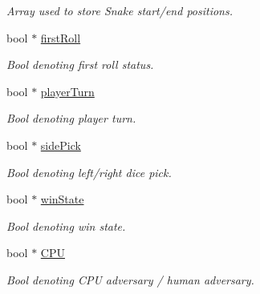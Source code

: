 \begin{DoxyCompactItemize}
\begin{DoxyCompactList}\small\item\em Array used to store Snake start/end positions. \end{DoxyCompactList}\item 
\hypertarget{classgameScene__1_a0743c43ab4837a641140be420ba832b3}{bool $\ast$ \hyperlink{classgameScene__1_a0743c43ab4837a641140be420ba832b3}{first\-Roll}}\label{classgameScene__1_a0743c43ab4837a641140be420ba832b3}

\begin{DoxyCompactList}\small\item\em Bool denoting first roll status. \end{DoxyCompactList}\item 
\hypertarget{classgameScene__1_a4963e2abbca839fd7c77e4f080e8a22f}{bool $\ast$ \hyperlink{classgameScene__1_a4963e2abbca839fd7c77e4f080e8a22f}{player\-Turn}}\label{classgameScene__1_a4963e2abbca839fd7c77e4f080e8a22f}

\begin{DoxyCompactList}\small\item\em Bool denoting player turn. \end{DoxyCompactList}\item 
\hypertarget{classgameScene__1_a696211afed2098458a2e81983c1915a9}{bool $\ast$ \hyperlink{classgameScene__1_a696211afed2098458a2e81983c1915a9}{side\-Pick}}\label{classgameScene__1_a696211afed2098458a2e81983c1915a9}

\begin{DoxyCompactList}\small\item\em Bool denoting left/right dice pick. \end{DoxyCompactList}\item 
\hypertarget{classgameScene__1_aa7b397c7669913d6823cd4e2383a845d}{bool $\ast$ \hyperlink{classgameScene__1_aa7b397c7669913d6823cd4e2383a845d}{win\-State}}\label{classgameScene__1_aa7b397c7669913d6823cd4e2383a845d}

\begin{DoxyCompactList}\small\item\em Bool denoting win state. \end{DoxyCompactList}\item 
\hypertarget{classgameScene__1_a9df5d2051adcf492fa1259129d3deb4b}{bool $\ast$ \hyperlink{classgameScene__1_a9df5d2051adcf492fa1259129d3deb4b}{C\-P\-U}}\label{classgameScene__1_a9df5d2051adcf492fa1259129d3deb4b}

\begin{DoxyCompactList}\small\item\em Bool denoting C\-P\-U adversary / human adversary. \end{DoxyCompactList}\end{DoxyCompactItemize}


